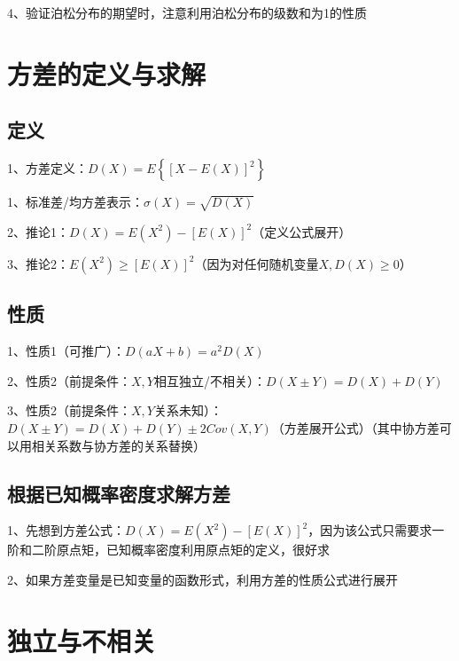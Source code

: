 4、验证泊松分布的期望时，注意利用泊松分布的级数和为1的性质

\section{方差的定义与求解}



\subsection{定义}

1、方差定义：$D(X)=E\left\{[X-E(X)]^{2}\right\}$

1、标准差/均方差表示：$\sigma(X)=\sqrt{D(X)}$

2、推论1：$D(X)=E\left(X^{2}\right)-[E(X)]^{2}$（定义公式展开）

3、推论2：$E\left(X^{2}\right) \geqslant[E(X)]^{2}$（因为对任何随机变量$X, D(X) \geqslant 0$）



\subsection{性质}

1、性质1（可推广）：$D(a X+b)=a^{2} D(X) $

2、性质2（前提条件：$X,Y$相互独立/不相关）：$D(X \pm Y)=D(X)+D(Y)$

3、性质2（前提条件：$X,Y$关系未知）：$D ( X \pm Y ) = D ( X ) + D ( Y ) \pm 2 Cov ( X , Y )  $（方差展开公式）（其中协方差可以用相关系数与协方差的关系替换）



\subsection{根据已知概率密度求解方差}

1、先想到方差公式：$D(X)=E\left(X^{2}\right)-[E(X)]^{2}$，因为该公式只需要求一阶和二阶原点矩，已知概率密度利用原点矩的定义，很好求

2、如果方差变量是已知变量的函数形式，利用方差的性质公式进行展开

\section{独立与不相关}



